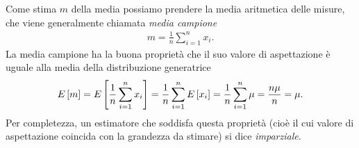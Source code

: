 Come stima $m$ della media possiamo prendere la media aritmetica delle misure,
che viene generalmente chiamata \emph{media campione}
\begin{align}\label{eq:media_campione}
  m = \frac{1}{n}\sum_{i = 1}^n x_i.
\end{align}
La media campione ha la buona proprietà che il suo valore di aspettazione
è uguale alla media della distribuzione generatrice
\begin{align*}
  \displaystyle E\left[m\right] = \displaystyle E\left[\frac{1}{n}\sum_{i = 1}^n x_i\right] =
  \frac{1}{n}\sum_{i = 1}^n \displaystyle E\left[x_i\right] = \frac{1}{n}\sum_{i = 1}^n \mu =
  \frac{n\mu}{n} = \mu.
\end{align*}
Per completezza, un estimatore che soddisfa questa proprietà (cioè il
cui valore di aspettazione coincida con la grandezza da stimare) si dice
\emph{imparziale}.

